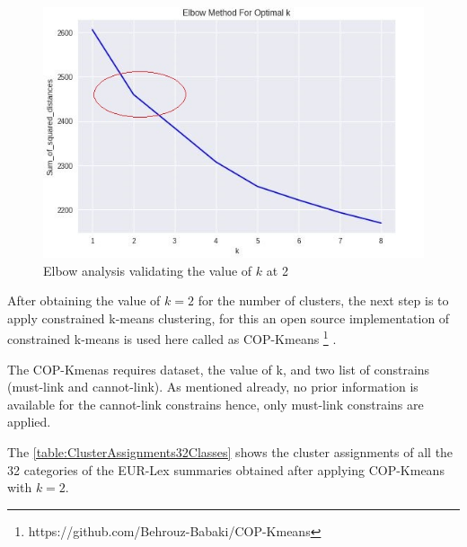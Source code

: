 \begin{figure}[!ht]
    \centering
    \includegraphics{pics/ElbowAT2.jpg}
    \caption{Elbow analysis validating the value of $k$ at 2}
    \label{fig:elbowAT2}
\end{figure}

After obtaining the value of $k = 2$ for the number of clusters, the next step is to apply constrained k-means clustering, for this an open source implementation of constrained k-means is used here called as COP-Kmeans \footnote{https://github.com/Behrouz-Babaki/COP-Kmeans} \cite{behrouz_babaki_2017_831850}. 

The COP-Kmenas requires dataset, the value of k, and two list of constrains (must-link and cannot-link). As mentioned already, no prior information is available for the cannot-link constrains hence, only must-link constrains are applied. 

The \ref{table:ClusterAssignments32Classes} shows the cluster assignments of all the 32 categories of the EUR-Lex summaries obtained after applying COP-Kmeans with $k=2$.



